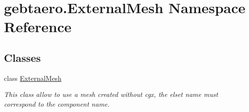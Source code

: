 \hypertarget{namespacegebtaero_1_1_external_mesh}{}\section{gebtaero.\+External\+Mesh Namespace Reference}
\label{namespacegebtaero_1_1_external_mesh}
\subsection*{Classes}
\begin{DoxyCompactItemize}
\item 
class \hyperlink{classgebtaero_1_1_external_mesh_1_1_external_mesh}{External\+Mesh}
\begin{DoxyCompactList}\small\item\em This class allow to use a mesh created without cgx, the elset name must correspond to the component name. \end{DoxyCompactList}\end{DoxyCompactItemize}
